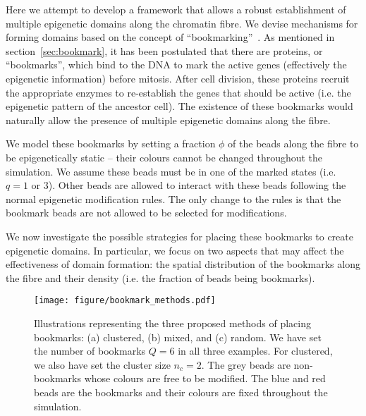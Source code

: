 \documentclass[12pt]{article}
\begin{document}
Here we attempt to develop a framework that allows a robust establishment of multiple epigenetic domains along the chromatin fibre. We devise mechanisms for forming domains based on the concept of ``bookmarking''~\cite{sarge2005}. As mentioned in section~\ref{sec:bookmark}, it has been postulated that there are proteins, or ``bookmarks'', which bind to the DNA to mark the active genes (effectively the epigenetic information) before mitosis. After cell division, these proteins recruit the appropriate enzymes to re-establish the genes that should be active (i.e. the epigenetic pattern of the ancestor cell). The existence of these bookmarks would naturally allow the presence of multiple epigenetic domains along the fibre.

We model these bookmarks by setting a fraction $\phi$ of the beads along the fibre to be epigenetically static -- their colours cannot be changed throughout the simulation. We assume these beads must be in one of the marked states (i.e. $q = 1$ or $3$). Other beads are allowed to interact with these beads following the normal epigenetic modification rules. The only change to the rules is that the bookmark beads are not allowed to be selected for modifications. 

We now investigate the possible strategies for placing these bookmarks to create epigenetic domains. In particular, we focus on two aspects that may affect the effectiveness of domain formation: the spatial distribution of the bookmarks along the fibre and their density (i.e. the fraction of beads being bookmarks). 

\begin{figure}[t]
\centering
\texttt{[image: figure/bookmark\_methods.pdf]}
\caption{Illustrations representing the three proposed methods of placing bookmarks: (a) clustered, (b) mixed, and (c) random.  We have set the number of bookmarks $Q = 6$ in all three examples. For clustered, we also have set the cluster size $n_c = 2$. The grey beads are non-bookmarks whose colours are free to be modified. The blue and red beads are the bookmarks and their colours are fixed throughout the simulation.}
\label{fig:bookmark_methods}
\end{figure}
\end{document}
